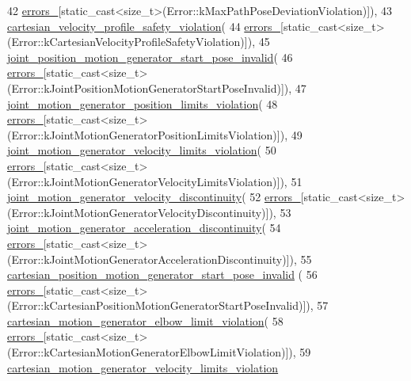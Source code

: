 \begin{DoxyCode}
42           \hyperlink{structfranka_1_1Errors_ab269bb0ad30eb1aaa7009a246be8e8aa}{errors\_}[static\_cast<size\_t>(Error::kMaxPathPoseDeviationViolation)]),
43       \hyperlink{structfranka_1_1Errors_afc093fc5f99e1f6cab6de4fa9bc32692}{cartesian\_velocity\_profile\_safety\_violation}(
44           \hyperlink{structfranka_1_1Errors_ab269bb0ad30eb1aaa7009a246be8e8aa}{errors\_}[static\_cast<size\_t>(Error::kCartesianVelocityProfileSafetyViolation)]),
45       \hyperlink{structfranka_1_1Errors_a7af91cbf61dc79304bff3ffadc51ea86}{joint\_position\_motion\_generator\_start\_pose\_invalid}(
46           \hyperlink{structfranka_1_1Errors_ab269bb0ad30eb1aaa7009a246be8e8aa}{errors\_}[static\_cast<size\_t>(Error::kJointPositionMotionGeneratorStartPoseInvalid)]),
47       \hyperlink{structfranka_1_1Errors_a9536ad072868b90525c56143cbb956ef}{joint\_motion\_generator\_position\_limits\_violation}(
48           \hyperlink{structfranka_1_1Errors_ab269bb0ad30eb1aaa7009a246be8e8aa}{errors\_}[static\_cast<size\_t>(Error::kJointMotionGeneratorPositionLimitsViolation)]),
49       \hyperlink{structfranka_1_1Errors_ae211638df9b0e23905c8a9d36e249207}{joint\_motion\_generator\_velocity\_limits\_violation}(
50           \hyperlink{structfranka_1_1Errors_ab269bb0ad30eb1aaa7009a246be8e8aa}{errors\_}[static\_cast<size\_t>(Error::kJointMotionGeneratorVelocityLimitsViolation)]),
51       \hyperlink{structfranka_1_1Errors_abd6da8e6a32d817a7b4848a24efd9379}{joint\_motion\_generator\_velocity\_discontinuity}(
52           \hyperlink{structfranka_1_1Errors_ab269bb0ad30eb1aaa7009a246be8e8aa}{errors\_}[static\_cast<size\_t>(Error::kJointMotionGeneratorVelocityDiscontinuity)]),
53       \hyperlink{structfranka_1_1Errors_a633195adca91f5ecaf1506da12f3311f}{joint\_motion\_generator\_acceleration\_discontinuity}(
54           \hyperlink{structfranka_1_1Errors_ab269bb0ad30eb1aaa7009a246be8e8aa}{errors\_}[static\_cast<size\_t>(Error::kJointMotionGeneratorAccelerationDiscontinuity)]),
55       \hyperlink{structfranka_1_1Errors_aa910fad4992b91be1ea1c321ee9b7a1e}{cartesian\_position\_motion\_generator\_start\_pose\_invalid}
      (
56           \hyperlink{structfranka_1_1Errors_ab269bb0ad30eb1aaa7009a246be8e8aa}{errors\_}[static\_cast<size\_t>(Error::kCartesianPositionMotionGeneratorStartPoseInvalid)]),
57       \hyperlink{structfranka_1_1Errors_ac21ebdc1e0e8fb3099a7dce284550c4c}{cartesian\_motion\_generator\_elbow\_limit\_violation}(
58           \hyperlink{structfranka_1_1Errors_ab269bb0ad30eb1aaa7009a246be8e8aa}{errors\_}[static\_cast<size\_t>(Error::kCartesianMotionGeneratorElbowLimitViolation)]),
59       \hyperlink{structfranka_1_1Errors_a91437c081452ef708563346b102ba894}{cartesian\_motion\_generator\_velocity\_limits\_violation}

\end{DoxyCode}

